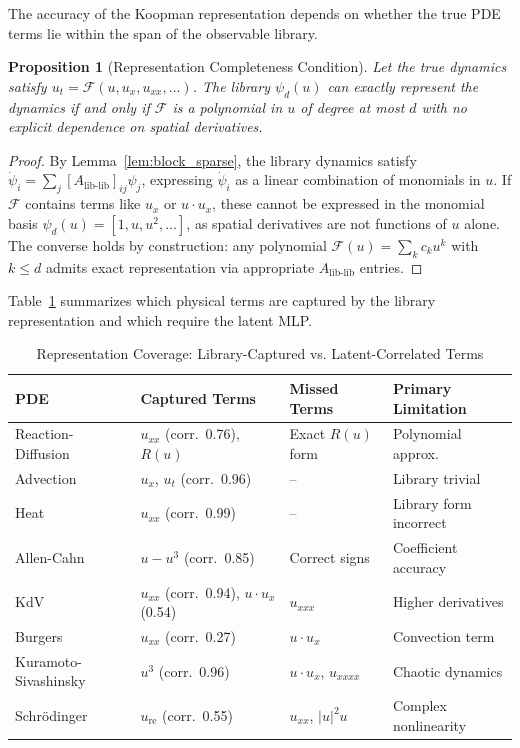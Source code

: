 \documentclass{article}
\newtheorem{proposition}{Proposition}
\theoremstyle{remark}
\begin{document}
The accuracy of the Koopman representation depends on whether the true PDE terms lie within the span of the observable library.

\begin{proposition}[Representation Completeness Condition]
\label{prop:completeness}
Let the true dynamics satisfy $u_t = \mathcal{F}(u, u_x, u_{xx}, \ldots)$. The library $\psi_d(u)$ can exactly represent the dynamics if and only if $\mathcal{F}$ is a polynomial in $u$ of degree at most $d$ with no explicit dependence on spatial derivatives.
\end{proposition}

\begin{proof}
By Lemma~\ref{lem:block_sparse}, the library dynamics satisfy $\dot{\psi}_i = \sum_j [A_{\text{lib-lib}}]_{ij} \psi_j$, expressing $\dot{\psi}_i$ as a linear combination of monomials in $u$. If $\mathcal{F}$ contains terms like $u_x$ or $u \cdot u_x$, these cannot be expressed in the monomial basis $\psi_d(u) = [1, u, u^2, \ldots]$, as spatial derivatives are not functions of $u$ alone. The converse holds by construction: any polynomial $\mathcal{F}(u) = \sum_k c_k u^k$ with $k \leq d$ admits exact representation via appropriate $A_{\text{lib-lib}}$ entries.
\end{proof}

Table~\ref{tab:representation_accuracy} summarizes which physical terms are captured by the library representation and which require the latent MLP.

\begin{table}[H]
\centering
\caption{Representation Coverage: Library-Captured vs. Latent-Correlated Terms}
\label{tab:representation_accuracy}
\begin{tabular}{llll}
\toprule
PDE & Captured Terms & Missed Terms & Primary Limitation \\
\midrule
Reaction-Diffusion & $u_{xx}$ (corr.~0.76), $R(u)$ & Exact $R(u)$ form & Polynomial approx. \\
Advection & $u_x$, $u_t$ (corr.~0.96) & -- & Library trivial \\
Heat & $u_{xx}$ (corr.~0.99) & -- & Library form incorrect \\
Allen-Cahn & $u - u^3$ (corr.~0.85) & Correct signs & Coefficient accuracy \\
KdV & $u_{xx}$ (corr.~0.94), $u \cdot u_x$ (0.54) & $u_{xxx}$ & Higher derivatives \\
Burgers & $u_{xx}$ (corr.~0.27) & $u \cdot u_x$ & Convection term \\
Kuramoto-Sivashinsky & $u^3$ (corr.~0.96) & $u \cdot u_x$, $u_{xxxx}$ & Chaotic dynamics \\
Schr\"odinger & $u_{\text{re}}$ (corr.~0.55) & $u_{xx}$, $|u|^2 u$ & Complex nonlinearity \\
\bottomrule
\end{tabular}
\end{table}
\end{document}
